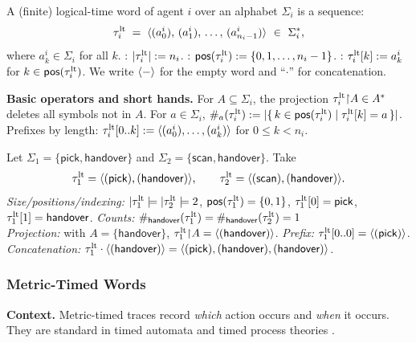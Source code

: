 \documentclass{article}
\begin{document}
  \begin{definition}
  A (finite) logical-time word of agent \(i\) over an alphabet \(\Sigma_i\) is a sequence:
  \[
  \tault_i \;=\; \trace{(a^i_0),\,(a^i_1),\,\dots,\,(a^i_{n_i-1})}\ \in\ \Sigma_i^{*},
  \]
  where \(a^i_k\in\Sigma_i\) for all \(k\).
  : \( |\tau^{\mathrm{lt}}_i| := n_i \).
  : \( \mathsf{pos}(\tau^{\mathrm{lt}}_i):=\{0,1,\dots,n_i-1\} \).
  : \( \tau^{\mathrm{lt}}_i[k] := a^i_k \) for \(k\in\mathsf{pos}(\tau^{\mathrm{lt}}_i)\).
  We write \( \langle - \rangle  \) for the empty word and “\(\cdot\)” for concatenation.
  \end{definition}
  
  \noindent\textbf{Basic operators and short hands.}
  For \(A\subseteq\Sigma_i\), the projection \( \tau^{\mathrm{lt}}_i{\upharpoonright}A \in A^{*} \) deletes all symbols not in \(A\).
  For \(a\in\Sigma_i\), \( \#_{a}(\tau^{\mathrm{lt}}_i) := |\{\,k\in\mathsf{pos}(\tau^{\mathrm{lt}}_i)\mid \tau^{\mathrm{lt}}_i[k]=a\,\}| \).
  Prefixes by length: \( \tau^{\mathrm{lt}}_i[0..k] := \langle (a^i_0),\dots,(a^i_{k}) \rangle  \) for \(0\le k<n_i\).
  
  \begin{example}
  Let \( \Sigma_1=\{\textsf{pick},\textsf{handover}\} \) and \( \Sigma_2=\{\textsf{scan},\textsf{handover}\} \).
  Take
  \[
  \tau^{\mathrm{lt}}_1=\langle (\textsf{pick}),(\textsf{handover}) \rangle ,\qquad
  \tau^{\mathrm{lt}}_2=\langle (\textsf{scan}),(\textsf{handover}) \rangle .
  \]
  \emph{Size/positions/indexing:}
  \(|\tau^{\mathrm{lt}}_1|=|\tau^{\mathrm{lt}}_2|=2\), \(\mathsf{pos}(\tau^{\mathrm{lt}}_1)=\{0,1\}\),
  \(\tau^{\mathrm{lt}}_1[0]=\textsf{pick}\), \(\tau^{\mathrm{lt}}_1[1]=\textsf{handover}\).
  \emph{Counts:} \(\#_{\textsf{handover}}(\tau^{\mathrm{lt}}_1)=\#_{\textsf{handover}}(\tau^{\mathrm{lt}}_2)=1\)\\
  \emph{Projection:} with \(A=\{\textsf{handover}\}\),
  \(\tau^{\mathrm{lt}}_1{\upharpoonright}A=\langle (\textsf{handover}) \rangle \).
  \emph{Prefix:} \(\tau^{\mathrm{lt}}_1[0..0]=\langle (\textsf{pick}) \rangle \).\\
  \emph{Concatenation:} \(\tau^{\mathrm{lt}}_1\cdot\langle (\textsf{handover}) \rangle 
  =\langle (\textsf{pick}),(\textsf{handover}),(\textsf{handover}) \rangle \).
  \end{example}
  
  \subsubsection{Metric-Timed Words}
  \noindent\textbf{Context.}
  Metric-timed traces record \emph{which} action occurs and \emph{when} it occurs.
  They are standard in timed automata and timed process theories \cite{AlurDill94}.
  
\end{document}
